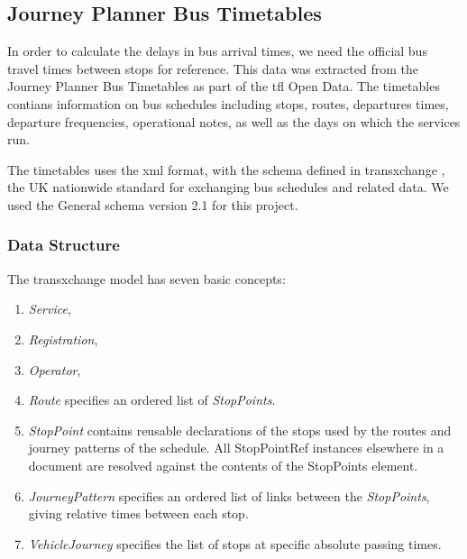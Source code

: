 \subsection{Journey Planner Bus Timetables}
In order to calculate the delays in bus arrival times, we need the official bus travel times between stops for reference. This data was extracted from the Journey Planner Bus Timetables\cite{open_data_feeds_description} as part of the \acrshort{tfl} Open Data. The timetables contians information on bus schedules including stops, routes, departures times, departure frequencies, operational notes, as well as the days on which the services run.

The timetables uses the \acrfull{xml} \cite{xml} format, with the schema defined in \gls{transxchange} \cite{transxchange}, the UK nationwide standard for exchanging bus schedules and related data. We used the General schema version 2.1\cite{transxchange_downloads_and_schema}\cite{transxchange_schema_2.1_xsd} for this project.

\subsubsection{Data Structure}
The \gls{transxchange} model has seven basic concepts\cite{transxchange_schema_guide}:
\begin{enumerate}
  \item \textit{Service},
  \item \textit{Registration},
  \item \textit{Operator},
  \item \textit{Route} specifies an ordered list of \textit{StopPoints}.
  \item \textit{StopPoint} contains reusable declarations of the stops used by the routes and journey patterns of the schedule. All StopPointRef instances elsewhere in a document are resolved against the contents of the StopPoints element.
  \item \textit{JourneyPattern} specifies an ordered list of links between the \textit{StopPoints}, giving
relative times between each stop.
  \item \textit{VehicleJourney} specifies the list of stops at specific absolute passing times.
\end{enumerate}

